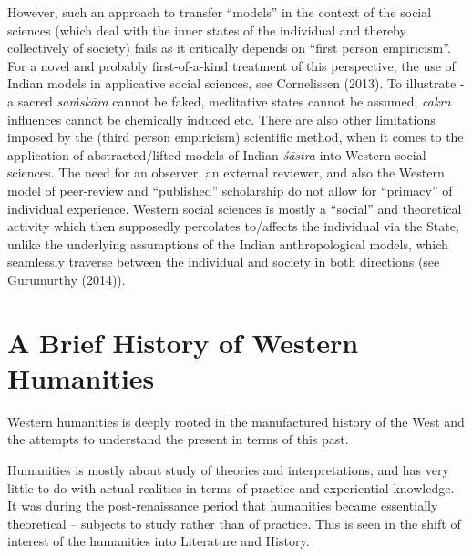 However, such an approach to transfer ``models'' in the context of the social sciences (which deal with the inner states of the individual and thereby collectively of society) fails as it critically depends on ``first person empiricism''. For a novel and probably first-of-a-kind treatment of this perspective, the use of Indian models in applicative social sciences, see Cornelissen (2013). To illustrate - a sacred {\sl saṁskāra} cannot be faked, meditative states cannot be assumed, {\sl cakra} influences cannot be chemically induced etc. There are also other limitations imposed by the (third person empiricism) scientific method, when it comes to the application of abstracted/lifted models of Indian {\sl śāstra} into Western social sciences. The need for an observer, an external reviewer, and also the Western model of peer-review and ``published'' scholarship do not allow for ``primacy'' of individual experience. Western social sciences is mostly a ``social'' and theoretical activity which then supposedly percolates to/affects the individual via the State, unlike the underlying assumptions of the Indian anthropological models, which seamlessly traverse between the individual and society in both directions (see Gurumurthy (2014)).

\section*{A Brief History of Western Humanities}

Western humanities is deeply rooted in the manufactured history of the West and the attempts to understand the present in terms of this past.

Humanities is mostly about study of theories and interpretations, and has very little to do with actual realities in terms of practice and experiential knowledge. It was during the post-renaissance period that  humanities became essentially theoretical -- subjects to study rather than of practice. This is seen in the shift of interest of the humanities into Literature and History.

